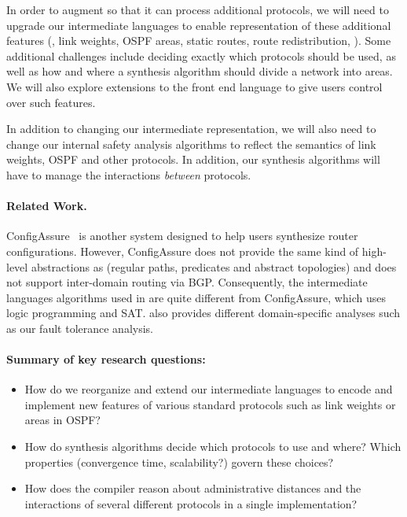 In order to
augment \Name so that it can process additional protocols, we will
need to upgrade our intermediate languages to enable representation 
of these additional features (\eg, link weights, OSPF areas, static routes,
route redistribution, \etc).  
Some additional challenges include deciding exactly which protocols should be used,
as well as how and where
a synthesis algorithm should divide a network into areas.  We will also
explore extensions to the \Name front end language to give users
control over such features.

In addition to changing our intermediate representation, we will also need to 
change our internal safety analysis algorithms to reflect the semantics of 
link weights, OSPF and other protocols.
In addition, our synthesis algorithms will have to manage the interactions
\emph{between} protocols.

\paragraph*{Related Work.}
ConfigAssure~\cite{narain:lisa05,narain+:configassure}  is another
system designed to help users synthesize
router configurations. However, ConfigAssure does not 
provide the same kind of high-level abstractions as \Name
(regular paths, predicates and abstract topologies) and does not
support inter-domain routing via BGP.  Consequently,
the intermediate languages algorithms used in \Name are quite
different from ConfigAssure, which uses logic programming and SAT.
\Name also provides different domain-specific analyses such as
our fault tolerance analysis.

\paragraph*{Summary of key research questions:}

\begin{itemize}
\item How do we reorganize and extend our intermediate languages to encode and
implement new features of various standard protocols such as link weights
or areas in OSPF?  
\item How do synthesis algorithms decide which protocols to use and where?
Which properties (convergence time, scalability?) govern these choices?
\item How does the compiler reason about administrative distances
and the interactions of several different protocols in a single
implementation?
\end{itemize}

